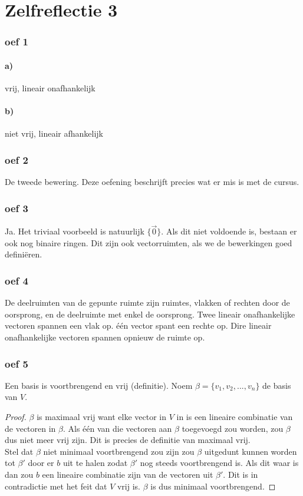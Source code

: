 \documentclass[lineaire_algebra_oplossingen.tex]{subfiles}
\begin{document}
\part{Zelfreflectie 3}
\section{oef 1}
\subsection*{a)}
vrij, lineair onafhankelijk
\subsection*{b)}
niet vrij, lineair afhankelijk

\section{oef 2}
De tweede bewering. Deze oefening beschrijft precies wat er mis is met de cursus.

\section{oef 3}
Ja. Het triviaal voorbeeld is natuurlijk $\{\vec{0}\}$. Als dit niet voldoende is, bestaan er ook nog binaire ringen. Dit zijn ook vectorruimten, als we de bewerkingen goed defini\"eren.

\section{oef 4}
De deelruimten van de gepunte ruimte zijn ruimtes, vlakken of rechten door de oorsprong, en de deelruimte met enkel de oorsprong. Twee lineair onafhankelijke vectoren spannen een vlak op. één vector spant een rechte op. Dire lineair onafhankelijke vectoren spannen opnieuw de ruimte op. 

\section{oef 5}
Een basis is voortbrengend en vrij (definitie). Noem $\beta = \{v_1,v_2,...,v_n\}$ de basis van $V$.
\begin{proof}
$\beta$ is maximaal vrij want elke vector in $V$ in is een lineaire combinatie van de vectoren in $\beta$. Als één van die vectoren aan $\beta$ toegevoegd zou worden, zou $\beta$ dus niet meer vrij zijn. Dit is precies de definitie van maximaal vrij.\\
Stel dat $\beta$ niet minimaal voortbrengend zou zijn zou $\beta$ uitgedunt kunnen worden tot $\beta'$ door er $b$ uit te halen zodat $\beta'$ nog steeds voortbrengend is. Als dit waar is dan zou $b$ een lineaire combinatie zijn van de vectoren uit $\beta'$. Dit is in contradictie met het feit dat $V$ vrij is. $\beta$ is dus minimaal voortbrengend.
\end{proof}
\end{document}
